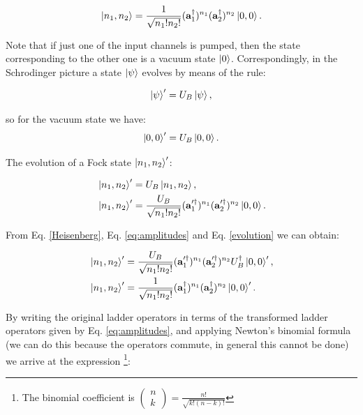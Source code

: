 \documentclass[12pt]{book}
\begin{document}
\begin{equation}
 \ket{n_{1},n_{2}}=\frac{1}{\sqrt{n_{1}! n_{2}!}} (\mathbf{a}_{1}^{\dagger})^{n_{1}}(\mathbf{a}_{2}^{\dagger})^{n_{2}} \ket{0,0}.
\end{equation}

Note that if just one of the input channels is pumped, then the state corresponding to the other one is a vacuum state $\ket{0}$. Correspondingly, in the Schrodinger picture a state $\ket{\psi}$ evolves by means of the rule:

\begin{equation}
 \ket{\psi}'=U_{B}\ket{\psi},
\end{equation}

so for the vacuum state we have:
\begin{equation}
 \ket{0,0}'=U_{B}\ket{0,0}.
 \label{evolution}
\end{equation}

The evolution of a Fock state $\ket{n_{1},n_{2}}'$:

\begin{align}
&\ket{n_{1},n_{2}}'=U_{B}\ket{n_{1},n_{2}},\\
&\ket{n_{1},n_{2}}'=\frac{U_{B}}{\sqrt{n_{1}! n_{2}!}} (\mathbf{a}_{1}'^{\dagger})^{n_{1}}(\mathbf{a}_{2}'^{\dagger})^{n_{2}} \ket{0,0}.
\end{align}

From Eq. \ref{Heisenberg}, Eq. \ref{eq:amplitudes} and Eq. \ref{evolution} we can obtain:

\begin{align}
&\ket{n_{1},n_{2}}' =\frac{U_{B}}{\sqrt{n_{1}! n_{2}!}} (\mathbf{a}_{1}'^{\dagger})^{n_{1}}(\mathbf{a}_{2}'^{\dagger})^{n_{2}} U^{\dagger}_{B}\ket{0,0}',\\
&\ket{n_{1},n_{2}}' =\frac{1}{\sqrt{n_{1}! n_{2}!}} (\mathbf{a}_{1}^{\dagger})^{n_{1}}(\mathbf{a}_{2}^{\dagger})^{n_{2}}\ket{0,0}'.
\end{align}

By writing the original ladder operators in terms of the transformed ladder operators given by Eq. \ref{eq:amplitudes}, and applying Newton's binomial formula (we can do this because the operators commute, in general this cannot be done) we arrive at the expression \footnote{ The binomial coefficient is $\begin{pmatrix} n \\ k \end{pmatrix} =\frac{n!}{\sqrt{k!(n-k)!}}$}:
\end{document}
